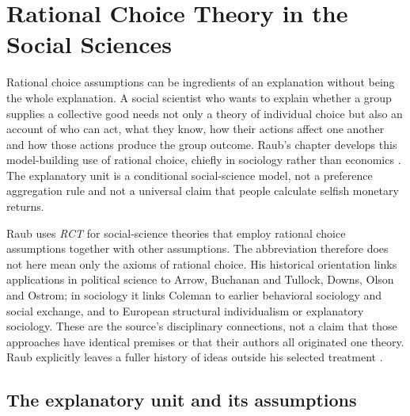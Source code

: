 \chapter{Rational Choice Theory in the Social Sciences}
\label{sec:p17-rationality-10-4}

Rational choice assumptions can be ingredients of an explanation without
being the whole explanation. A social scientist who wants to explain whether
a group supplies a collective good needs not only a theory of individual
choice but also an account of who can act, what they know, how their actions
affect one another and how those actions produce the group outcome.
Raub's chapter develops this model-building use of rational choice, chiefly
in sociology rather than economics
\parencite[pp.~611--623]{Raub2021RationalChoiceSocialSciences}.
The explanatory unit is a conditional social-science model, not a preference
aggregation rule and not a universal claim that people calculate selfish
monetary returns.

Raub uses \emph{RCT} for social-science theories that employ rational choice
assumptions together with other assumptions. The abbreviation therefore does
not here mean only the axioms of rational choice. His historical orientation
links applications in political science to Arrow, Buchanan and Tullock,
Downs, Olson and Ostrom; in sociology it links Coleman to earlier behavioral
sociology and social exchange, and to European structural individualism or
explanatory sociology. These are the source's disciplinary connections, not
a claim that those approaches have identical premises or that their authors
all originated one theory. Raub explicitly leaves a fuller history of ideas
outside his selected treatment
\parencite[pp.~611, 620, note~1]{Raub2021RationalChoiceSocialSciences}.

\section{The explanatory unit and its assumptions}
\label{sec:p17-rat104-explanatory-unit}

